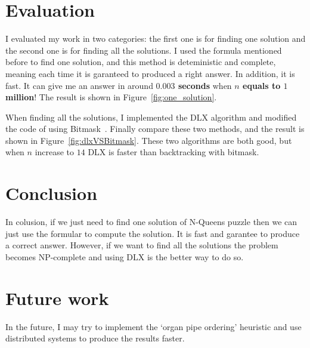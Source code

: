 \section{Evaluation}
I evaluated my work in two categories: the first one is for finding one solution and the second one is for finding all the solutions. I used the formula mentioned before to find one solution, and this method is deteministic and complete, meaning each time it is garanteed to produced a right answer. In addition, it is fast. It can give me an answer in around \textbf{$0.003$ seconds} when \textbf{$n$ equals to $1$ million}! The result is shown in Figure~\ref{fig:one_solution}.


When finding all the solutions, I implemented the DLX algorithm and modified the code of using Bitmask~\cite{noauthor_accepted_2015}. Finally compare these two methods, and the result is shown in Figure~\ref{fig:dlxVSBitmask}. These two algorithms are both good, but when $n$ increase to $14$ DLX is faster than backtracking with bitmask.



\section{Conclusion}
In colusion, if we just need to find one solution of N-Queens puzzle then we can just use the formular to compute the solution. It is fast and garantee to produce a correct answer. However, if we want to find all the solutions the problem becomes NP-complete and using DLX is the better way to do so.

\section{Future work}
In the future, I may try to implement the `organ pipe ordering' heuristic and use distributed systems to produce the results faster.

\pagebreak

{}





